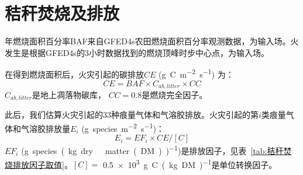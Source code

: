 \section{秸秆焚烧及排放}
年燃烧面积百分率BAF来自GFED4s农田燃烧面积百分率观测数据，为输入场。火发生是根据GFED4s的3小时数据找到的燃烧顶峰时步中心点，为输入场。

在得到燃烧面积后，火灾引起的碳排放$CE$ (\unit{g.C.m^{-2}.s^{-1}}) 为：
\begin{equation}
CE=BAF \times C_{ab,litter} \times CC
\end{equation}
$C_{ab,litter}$是地上凋落物碳库， $CC=0.8$是燃烧完全因子。

此后，我们估算火灾引起的33种痕量气体和气溶胶排放。火灾引起的第$i$类痕量气体和气溶胶排放量$E_i$ (\unit{g.species.m^{-2}.s^{-1}})：
\begin{equation}
E_{i}=EF_{i} \times CE /[{C}]
\end{equation}
$EF_i$ (\unit{g.species.(kg.dry\ matter(DM))^{-1}})是排放因子，见表~\ref{tab:秸秆焚烧排放因子取值}。$[C]=$ \qty{0.5e3}{g.C.(kg.DM)^{-1}}是单位转换因子。


